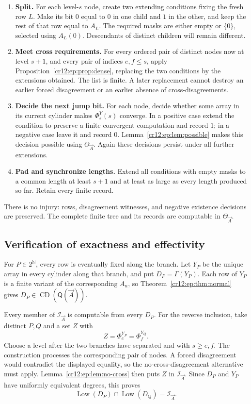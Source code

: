 \documentclass[11pt,letterpaper]{article}
\theoremstyle{plain}
\theoremstyle{definition}
\theoremstyle{remark}
\numberwithin{equation}{section}
\newcommand{\N}{\mathbb N}
\newcommand{\Cantor}{2^{\N}}
\newcommand{\CD}{\operatorname{CD}}
\newcommand{\Low}{\operatorname{Low}}
\newcommand{\I}{\mathcal I}
\newcommand{\QQ}{\mathsf Q}              %
\begin{document}
\begin{enumerate}[label=\textbf{\arabic*.},leftmargin=2em]
\item \textbf{Split.} For each level-$s$ node, create two extending conditions fixing
the fresh row $L$. Make its bit $0$ equal to $0$ in one child and $1$ in the other,
and keep the rest of that row equal to $A_L$. The required masks are either empty or
$\{0\}$, selected using $A_L(0)$. Descendants of distinct children will remain
different.
\item \textbf{Meet cross requirements.} For every ordered pair of distinct nodes now
at level $s+1$, and every pair of indices $e,f\le s$, apply
Proposition~\ref{cr12:ep:prop:dense}, replacing the two conditions by the extensions
obtained. The list is finite. A later replacement cannot destroy an earlier forced
disagreement or an earlier absence of cross-disagreements.
\item \textbf{Decide the next jump bit.} For each node, decide whether some array in
its current cylinder makes $\Phi_s^Y(s)$ converge. In a positive case extend the
condition to preserve a finite convergent computation and record $1$; in a negative
case leave it and record $0$. Lemma~\ref{cr12:ep:lem:possible} makes this decision
possible using $\Theta_{\vec A}$. Again these decisions persist under all further
extensions.
\item \textbf{Pad and synchronize lengths.} Extend all conditions with empty masks to a
common length at least $s+1$ and at least as large as every length produced so far.
Retain every finite record.
\end{enumerate}

There is no injury: rows, disagreement witnesses, and negative existence decisions
are preserved. The complete finite tree and its records are computable in
$\Theta_{\vec A}$.

\subsection{Verification of exactness and effectivity}
For $P\in\Cantor$, every row is eventually fixed along the branch. Let $Y_P$ be the
unique array in every cylinder along that branch, and put $D_P=\Gamma(Y_P)$. Each
row of $Y_P$ is a finite variant of the corresponding $A_n$, so
Theorem~\ref{cr12:ep:thm:normal} gives $D_P\in\CD(\QQ(\vec A))$.

Every member of $\I_{\vec A}$ is computable from every $D_P$. For the reverse
inclusion, take distinct $P,Q$ and a set $Z$ with
\[
 Z=\Phi_e^{Y_P}=\Phi_f^{Y_Q}.
\]
Choose a level after the two branches have separated and with $s\ge e,f$. The
construction processes the corresponding pair of nodes. A forced disagreement would
contradict the displayed equality, so the no-cross-disagreement alternative must
apply. Lemma~\ref{cr12:ep:lem:no-cross} then puts $Z$ in $\I_{\vec A}$. Since $D_P$
and $Y_P$ have uniformly equivalent degrees, this proves
\[
 \Low(D_P)\cap\Low(D_Q)=\I_{\vec A}.
\]
\end{document}
